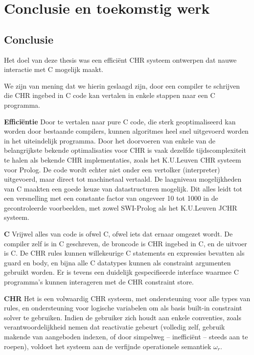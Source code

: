 \chapter{Conclusie en toekomstig werk} \label{chap:concl}

\section{Conclusie}

Het doel van deze thesis was een effici\"ent CHR systeem ontwerpen dat nauwe interactie met C mogelijk maakt.

We zijn van mening dat we hierin geslaagd zijn, door een compiler te schrijven die CHR ingebed in C code kan vertalen in enkele stappen naar een C programma.

{\bf Effici\"entie} Door te vertalen naar pure C code, die sterk geoptimaliseerd kan worden door bestaande compilers, kunnen algoritmes heel snel uitgevoerd worden in het uiteindelijk programma. Door het doorvoeren van enkele van de belangrijkste bekende optimalisaties voor CHR is vaak dezelfde tijdscomplexiteit te halen als bekende CHR implementaties, zoals het K.U.Leuven CHR systeem voor Prolog. De code wordt echter niet onder een vertolker (interpreter) uitgevoerd, maar direct tot machinetaal vertaald. De laagniveau mogelijkheden van C maakten een goede keuze van datastructuren mogelijk. Dit alles leidt tot een versnelling met een constante factor van ongeveer 10 tot 1000 in de gecontroleerde voorbeelden, met zowel SWI-Prolog als het K.U.Leuven JCHR systeem.

{\bf C} Vrijwel alles van code is ofwel C, ofwel iets dat ernaar omgezet wordt. De compiler zelf is in C geschreven, de broncode is CHR ingebed in C, en de uitvoer is C. De CHR rules kunnen willekeurige C statements en expressies bevatten als guard en body, en bijna alle C datatypes kunnen als constraint argumenten gebruikt worden. Er is tevens een duidelijk gespecifieerde interface waarmee C programma's kunnen interageren met de CHR constraint store.

{\bf CHR} Het is een volwaardig CHR systeem, met ondersteuning voor alle types van rules, en ondersteuning voor logische variabelen om als basis built-in constraint solver te gebruiken. Indien de gebruiker zich houdt aan enkele conventies, zoals verantwoordelijkheid nemen dat reactivatie gebeurt (volledig zelf, gebruik makende van aangeboden indexen, of door simpelweg -- ineffici\"ent -- steeds  aan te roepen), voldoet het systeem aan de verfijnde operationele semantiek $\omega_r$.

